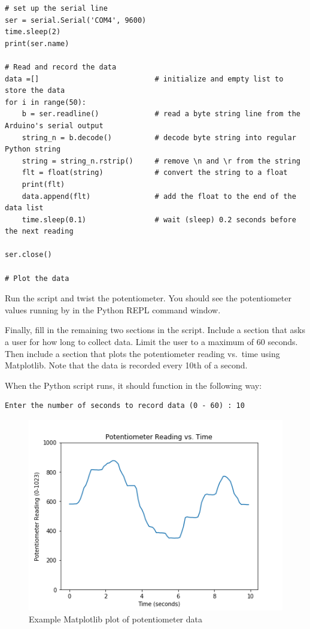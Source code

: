 \begin{verbatim}
# set up the serial line
ser = serial.Serial('COM4', 9600)
time.sleep(2)
print(ser.name)

# Read and record the data
data =[]                           # initialize and empty list to store the data
for i in range(50):
    b = ser.readline()             # read a byte string line from the Arduino's serial output
    string_n = b.decode()          # decode byte string into regular Python string
    string = string_n.rstrip()     # remove \n and \r from the string
    flt = float(string)            # convert the string to a float
    print(flt)
    data.append(flt)               # add the float to the end of the data list
    time.sleep(0.1)                # wait (sleep) 0.2 seconds before the next reading

ser.close()

# Plot the data
\end{verbatim}

Run the script and twist the potentiometer. You should see the
potentiometer values running by in the Python REPL command window.

Finally, fill in the remaining two sections in the script. Include a
section that asks a user for how long to collect data. Limit the user to
a maximum of 60 seconds. Then include a section that plots the
potentiometer reading vs.~time using Matplotlib. Note that the data is
recorded every 10th of a second.

When the Python script runs, it should function in the following way:

\begin{verbatim}
Enter the number of seconds to record data (0 - 60) : 10
\end{verbatim}

\begin{figure}[h!]
\centering
\includegraphics{images/potentiometer_reading.png}
\caption{Example Matplotlib plot of potentiometer data}
\end{figure}

